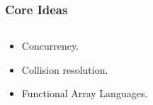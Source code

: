 \documentclass[aspectratio=169]{beamer}
\newcommand{\kw}[1]{\ensuremath{\mathtt{#1}}}
\newcommand{\Map}{\kw{map}}
\begin{document}
\begin{frame}\frametitle{Core Ideas}
  \begin{columns}
  \begin{column}{.38\textwidth}
  \hfill
  \begin{itemize}
    \item<1-> Concurrency.
    \item<2-> Collision resolution.
    \item<3-> Functional Array Languages.
  \end{itemize}
  \hfill  
  \end{column}
  \hfill
  \begin{column}{.6\textwidth}
    \onslide<3->{
      \begin{align*}
        \Map & : (\alpha \to \beta) \to [n]\alpha \to [n]\beta
      \end{align*}  
    }
  \end{column}
  \end{columns}
\end{frame}
\end{document}
